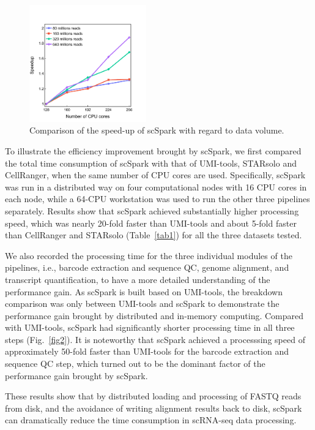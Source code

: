 \documentclass[conference]{IEEEtran}
\begin{document}
\begin{figure}
	\centering
	\includegraphics[width=0.45\textwidth]{fig5.pdf}
	\caption{Comparison of the speed-up of scSpark with regard to data volume.} \label{fig5}
\end{figure}

To illustrate the efficiency improvement brought by scSpark, we first compared the total time consumption of scSpark with that of UMI-tools, STARsolo and CellRanger, when the same number of CPU cores are used. Specifically, scSpark was run in a distributed way on four computational nodes with 16 CPU cores in each node, while a 64-CPU workstation was used to run the other three pipelines separately. 
Results show that scSpark achieved substantially higher processing speed, which was nearly 20-fold faster than UMI-tools and about 5-fold faster than CellRanger and STARsolo (Table~\ref{tab1}) for all the three datasets tested.  

We also recorded the processing time for the three individual modules of the pipelines, i.e., barcode extraction and sequence QC, genome alignment, and transcript quantification, to have a more detailed understanding of the performance gain. 
As scSpark is built based on UMI-tools, the breakdown comparison was only between UMI-tools and scSpark to demonstrate the performance gain brought by distributed and in-memory computing. 
Compared with UMI-tools, scSpark had significantly shorter processing time in all three steps (Fig.~\ref{fig2}).
It is noteworthy that scSpark achieved a processsing speed of approximately 50-fold faster than UMI-tools for the barcode extraction and sequence QC step, which turned out to be the dominant factor of the performance gain brought by scSpark. 

These results show that by distributed loading and processing of FASTQ reads from disk, and the avoidance of writing alignment results back to disk, scSpark can dramatically reduce the time consumption in scRNA-seq data processing. 
\end{document}
